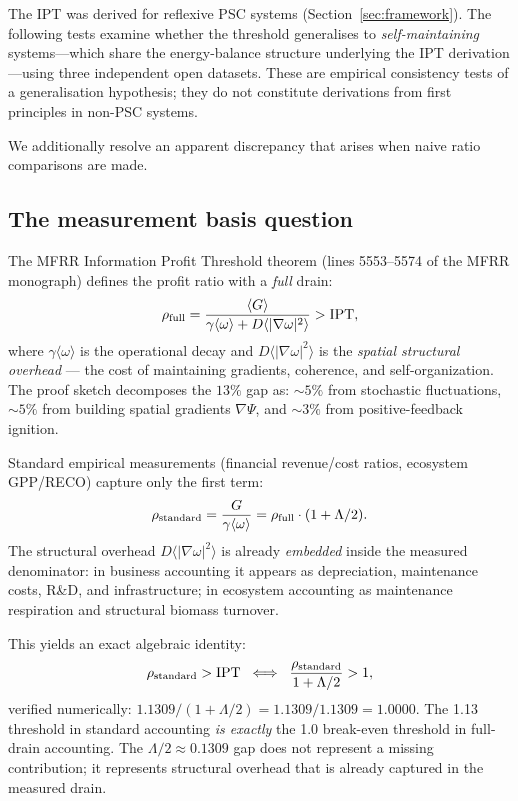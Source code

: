 \documentclass[11pt,twocolumn]{article}
\theoremstyle{remark}
\begin{document}
The IPT was derived for reflexive PSC systems (Section~\ref{sec:framework}). The following
tests examine whether the threshold generalises to \emph{self-maintaining} systems---which
share the energy-balance structure underlying the IPT derivation---using three independent
open datasets. These are empirical consistency tests of a generalisation hypothesis; they do
not constitute derivations from first principles in non-PSC systems.

We additionally resolve an apparent discrepancy that arises when naive ratio comparisons are made.

\subsection{The measurement basis question}
\label{sec:realworld:basis}

The MFRR Information Profit Threshold theorem (lines 5553--5574 of the MFRR monograph) defines the profit ratio with a \emph{full} drain:
\[
  \rho_{\rm full}
  = \frac{\langle G \rangle}{\gamma\langle\omega\rangle + D\langle|\nabla\omega|^2\rangle}
  > \mathrm{IPT},
\]
where $\gamma\langle\omega\rangle$ is the operational decay and $D\langle|\nabla\omega|^2\rangle$ is the \emph{spatial structural overhead} --- the cost of maintaining gradients, coherence, and self-organization. The proof sketch decomposes the $13\%$ gap as: $\sim 5\%$ from stochastic fluctuations, $\sim 5\%$ from building spatial gradients $\nabla\Psi$, and $\sim 3\%$ from positive-feedback ignition.

Standard empirical measurements (financial revenue/cost ratios, ecosystem GPP/RECO) capture only the first term:
\[
  \rho_{\rm standard}
  = \frac{G}{\gamma\langle\omega\rangle}
  = \rho_{\rm full} \cdot (1 + \Lambda/2).
\]
The structural overhead $D\langle|\nabla\omega|^2\rangle$ is already \emph{embedded} inside the measured denominator: in business accounting it appears as depreciation, maintenance costs, R\&D, and infrastructure; in ecosystem accounting as maintenance respiration and structural biomass turnover.

This yields an exact algebraic identity:
\[
  \rho_{\rm standard} > \mathrm{IPT}
  \;\iff\;
  \frac{\rho_{\rm standard}}{1 + \Lambda/2} > 1,
\]
verified numerically: $1.1309 / (1 + \Lambda/2) = 1.1309/1.1309 = 1.0000$. The 1.13 threshold in standard accounting \emph{is exactly} the 1.0 break-even threshold in full-drain accounting. The $\Lambda/2 \approx 0.1309$ gap does not represent a missing contribution; it represents structural overhead that is already captured in the measured drain.
\end{document}
